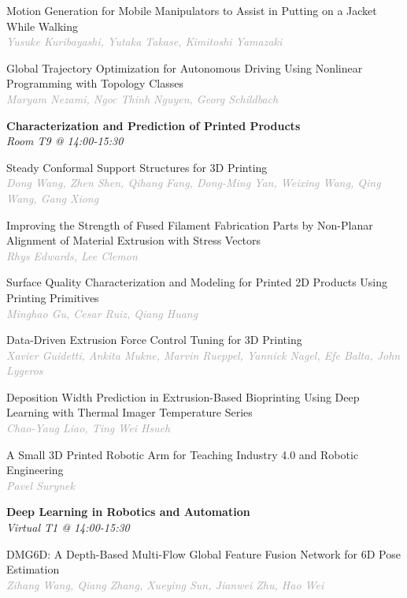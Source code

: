 \begin{multicols*}{2}
\small Motion Generation for Mobile Manipulators to Assist in Putting on a Jacket While Walking\\ 
\footnotesize \textcolor{darkgray}{\textit{Yusuke Kuribayashi, Yutaka  Takase, Kimitoshi  Yamazaki}}

\small Global Trajectory Optimization for Autonomous Driving Using Nonlinear Programming with Topology Classes\\ 
\footnotesize \textcolor{darkgray}{\textit{Maryam Nezami, Ngoc Thinh  Nguyen, Georg  Schildbach}}

\normalsize \textbf{Characterization and Prediction of Printed Products}\\
\small \textit{Room T9 @ 14:00-15:30}

\small Steady Conformal Support Structures for 3D Printing\\ 
\footnotesize \textcolor{darkgray}{\textit{Dong Wang, Zhen  Shen, Qihang  Fang, Dong-Ming  Yan, Weixing  Wang, Qing  Wang, Gang  Xiong}}

\small Improving the Strength of Fused Filament Fabrication Parts by Non-Planar Alignment of Material Extrusion with Stress Vectors\\ 
\footnotesize \textcolor{darkgray}{\textit{Rhys Edwards, Lee  Clemon}}

\small Surface Quality Characterization and Modeling for Printed 2D Products Using Printing Primitives\\ 
\footnotesize \textcolor{darkgray}{\textit{Minghao Gu, Cesar  Ruiz, Qiang  Huang}}

\small Data-Driven Extrusion Force Control Tuning for 3D Printing\\ 
\footnotesize \textcolor{darkgray}{\textit{Xavier Guidetti, Ankita  Mukne, Marvin  Rueppel, Yannick  Nagel, Efe  Balta, John  Lygeros}}

\small Deposition Width Prediction in Extrusion-Based Bioprinting Using Deep Learning with Thermal Imager Temperature Series\\ 
\footnotesize \textcolor{darkgray}{\textit{Chao-Yaug Liao, Ting Wei  Hsueh}}

\small A Small 3D Printed Robotic Arm for Teaching Industry 4.0 and Robotic Engineering\\ 
\footnotesize \textcolor{darkgray}{\textit{Pavel Surynek}}

\normalsize \textbf{Deep Learning in Robotics and Automation}\\
\small \textit{Virtual T1 @ 14:00-15:30}

\small DMG6D: A Depth-Based Multi-Flow Global Feature Fusion Network for 6D Pose Estimation\\ 
\footnotesize \textcolor{darkgray}{\textit{Zihang Wang, Qiang  Zhang, Xueying  Sun, Jianwei  Zhu, Hao  Wei}}


\end{multicols*}
